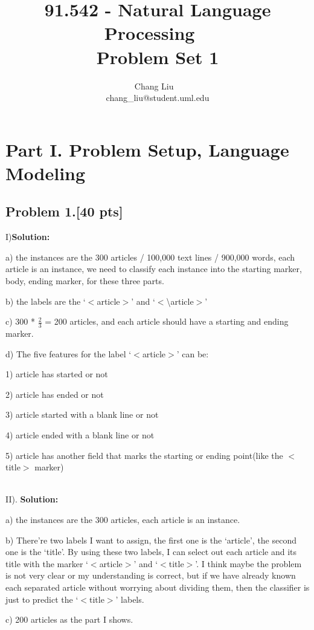 \documentclass{article}
\title{91.542 - Natural Language Processing ~\\ Problem Set 1}
\author{Chang Liu ~\\ chang\_liu@student.uml.edu}
\begin{document}
\maketitle


\section{Part I. Problem Setup, Language Modeling}

\subsection{Problem 1.[40 pts]}

I)\textbf{Solution:}

a) the instances are the 300 articles / 100,000 text lines / 900,000 words, each article is an instance, we need to classify each instance into the starting marker, body, ending marker, for these three parts.

b) the labels are the `$<$article$>$' and `$<$\textbackslash{}article$>$'

c) 300 * $\frac{2}{3}$ = 200 articles, and each article should have a starting and ending marker.

d) The five features for the label `$<$article$>$' can be:

1) article has started or not

2) article has ended or not

3) article started with a blank line or not

4) article ended with a blank line or not

5) article has another field that marks the starting or ending point(like the $<$title$>$ marker)

~\\

II). \textbf{Solution:}

a) the instances are the 300 articles, each article is an instance.

b) There're two labels I want to assign, the first one is the `article', the second one is the `title'. By using these two labels, I can select out each article and its title with the marker `$<$article$>$' and `$<$title$>$'. I think maybe the problem is not very clear or my understanding is correct, but if we have already known each separated article without worrying about dividing them, then the classifier is just to predict the `$<$title$>$' labels.

c) 200 articles as the part I shows.
\end{document}
